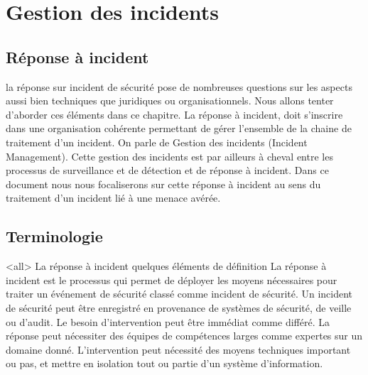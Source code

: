 %
%
\section{Gestion des incidents}
\subsection{Réponse à incident}

la réponse sur incident de sécurité pose de nombreuses questions sur les aspects aussi bien techniques que juridiques ou organisationnels. Nous allons tenter d'aborder ces éléments dans ce chapitre. La réponse à incident, doit s'inscrire dans une organisation cohérente permettant de gérer l'ensemble de la chaine de traitement d'un incident. On parle de Gestion des incidents (Incident Management). Cette gestion des incidents est par ailleurs à cheval entre les processus de surveillance et de détection et de réponse à incident. Dans ce document nous nous focaliserons sur cette réponse à incident au sens du traitement d'un incident lié à une menace avérée.

\subsection{Terminologie}

\mode<all>{\texframe
{La réponse à incident}
{quelques éléments de définition}
{%
La réponse à incident est le processus qui permet de déployer les moyens nécessaires pour traiter un événement de sécurité classé comme incident de sécurité.
Un incident de sécurité peut être enregistré en provenance de systèmes de sécurité, de veille ou d'audit. Le besoin d'intervention peut être immédiat comme différé.
La réponse peut nécessiter des équipes de compétences larges comme expertes sur un domaine donné. L'intervention peut nécessité des moyens techniques important ou pas, et mettre en isolation tout ou partie d'un système d'information.
}} %


